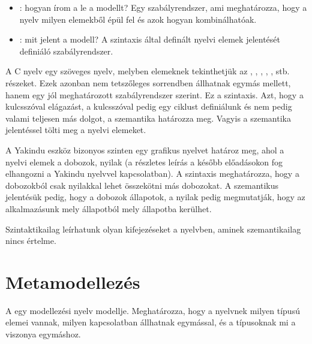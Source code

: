 \begin{itemize}
	\item {}: hogyan írom a le a modellt? Egy szabályrendszer, ami meghatározza, hogy a nyelv milyen elemekből épül fel és azok hogyan kombinálhatóak.
	\item {}: mit jelent a modell? A szintaxis által definált nyelvi elemek jelentését definiáló szabályrendszer.
\end{itemize}

\begin{megjegyzes}
	A C nyelv egy szöveges nyelv, melyben elemeknek tekinthetjük az , , , , ,  stb. részeket. Ezek azonban nem tetszőleges sorrendben állhatnak egymás mellett, hanem egy jól meghatározott szabályrendszer szerint. Ez a szintaxis. Azt, hogy a  kulcsszóval elágazást, a  kulcsszóval pedig egy ciklust definiálunk és nem pedig valami teljesen más dolgot, a szemantika határozza meg. Vagyis a szemantika jelentéssel tölti meg a nyelvi elemeket.
\end{megjegyzes}

\begin{megjegyzes}
	A Yakindu eszköz bizonyos szinten egy grafikus nyelvet határoz meg, ahol a nyelvi elemek a dobozok, nyilak (a részletes leírás a később előadásokon fog elhangozni a Yakindu nyelvvel kapcsolatban). A szintaxis meghatározza, hogy a dobozokból csak nyilakkal lehet összekötni más dobozokat. A szemantikus jelentésük pedig, hogy a dobozok állapotok, a nyilak pedig megmutatják, hogy az alkalmazásunk mely állapotból mely állapotba kerülhet.
\end{megjegyzes}

\begin{megjegyzes}
	Szintaktikailag leírhatunk olyan kifejezéseket a nyelvben, aminek szemantikailag nincs értelme.	
\end{megjegyzes}


\section{Metamodellezés}

\begin{definicio}
	A  egy modellezési nyelv modellje. Meghatározza, hogy a nyelvnek milyen típusú elemei vannak, milyen kapcsolatban állhatnak egymással, és a típusoknak mi a viszonya egymáshoz.
\end{definicio}

